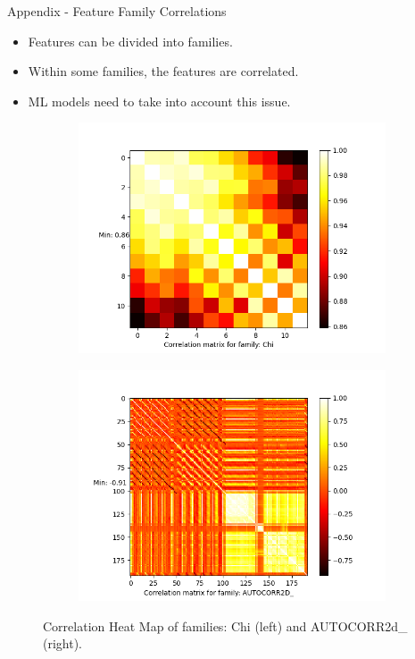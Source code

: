 \documentclass{beamer}
\begin{document}
\begin{frame}[t]{Appendix - Feature Family Correlations}
\begin{itemize}
\item Features can be divided into families.
\item Within some families, the features are correlated.
\item ML models need to take into account this issue.
\end{itemize}
\begin{figure}[htb]
    \begin{subfigure}[b]{0.49\textwidth}
         \centering
         \includegraphics[scale=0.25]{images/correlationChi}
        \label{fig:correlationChi}
     \end{subfigure}
     \hfill
    \begin{subfigure}[b]{0.49\textwidth}
         \centering
         \includegraphics[scale=0.25]{images/correlationAUTOCORR2D}
        \label{fig:correlationfr}
     \end{subfigure}
     \caption{Correlation Heat Map of families: Chi (left) and AUTOCORR2d\_ (right).}
     \label{fig:correlationheatmap}
\end{figure}
\end{frame}
\end{document}
